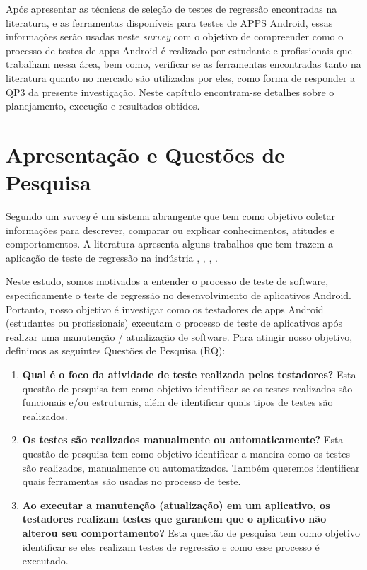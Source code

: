 \acresetall 

Após apresentar as técnicas de seleção de testes de regressão encontradas na literatura, e as ferramentas disponíveis para testes de \ac{APPS} Android, essas informações serão usadas neste \textit{survey} com o objetivo de compreender como o processo de testes de apps Android é realizado por estudante e profissionais que trabalham nessa área, bem como, verificar se as ferramentas encontradas tanto na literatura quanto no mercado são utilizadas por eles, como forma de responder a QP3 da presente investigação. Neste capítulo encontram-se detalhes sobre o planejamento, execução e resultados obtidos.


\section{Apresentação e Questões de Pesquisa}\label{rqsurvey}

Segundo \cite{PSK2001} um \textit{survey} é um sistema abrangente que tem como objetivo coletar informações para descrever, comparar ou explicar conhecimentos, atitudes e comportamentos. A literatura apresenta alguns trabalhos que tem trazem a aplicação de teste de regressão na indústria \cite{Ali2019}, \cite{8094467}, \cite{7102609}, \cite{630875}.

Neste estudo, somos motivados a entender o processo de teste de software, especificamente o teste de regressão no desenvolvimento de aplicativos Android. Portanto, nosso objetivo é investigar como os testadores de apps Android (estudantes ou profissionais) executam o processo de teste de aplicativos após realizar uma manutenção / atualização de software. Para atingir nosso objetivo, definimos as seguintes Questões de Pesquisa (RQ):

\begin{enumerate}[label=\bf QP\arabic*,leftmargin=1.8cm]
    
    \item \textbf{Qual é o foco da atividade de teste realizada pelos testadores?} Esta questão de pesquisa tem como objetivo identificar se os testes realizados são funcionais e/ou estruturais, além de identificar quais tipos de testes são realizados.
    
    \item \textbf{Os testes são realizados manualmente ou automaticamente?} Esta questão de pesquisa tem como objetivo identificar a maneira como os testes são realizados, manualmente ou automatizados. Também queremos identificar quais ferramentas são usadas no processo de teste.
    
    \item \textbf{Ao executar a manutenção (atualização) em um aplicativo, os testadores realizam testes que garantem que o aplicativo não alterou seu comportamento?} Esta questão de pesquisa tem como objetivo identificar se eles realizam testes de regressão e como esse processo é executado.
    
\end{enumerate}

